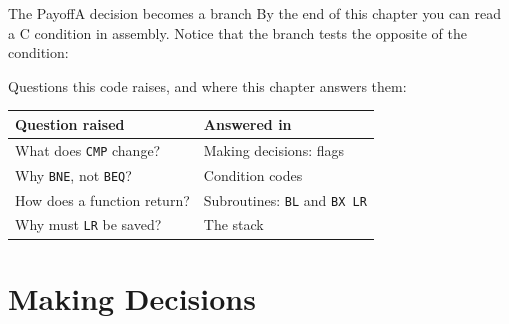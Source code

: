 \documentclass[9pt,aspectratio=169,xcolor=table]{beamer}
\begin{document}
{\beamerextras
\begin{frame}[fragile]{The Payoff}{A decision becomes a branch}
    \leavevmode
    By the end of this chapter you can read a C condition in assembly. Notice that the branch tests the \alert{opposite} of the condition:

    \vspace{2mm}
    \begin{center}
    \begin{minipage}{.9\textwidth}
    \end{minipage}
    \end{center}

    \vspace{2mm}
    {\small Questions this code raises, and where this chapter answers them:}

    \vspace{1mm}
    \begin{center}
    {\small
    \striped
    \begin{tabular}{@{}l R{.52\textwidth}@{}}
        \toprule
        \textbf{Question raised} & \textbf{Answered in} \\
        \midrule
        What does \texttt{CMP} change? & Making decisions: flags \\
        Why \texttt{BNE}, not \texttt{BEQ}? & Condition codes \\
        How does a function return? & Subroutines: \texttt{BL} and \texttt{BX LR} \\
        Why must \texttt{LR} be saved? & The stack \\
        \bottomrule
    \end{tabular}}
    \end{center}
\end{frame}
}


\section{Making Decisions}
\end{document}
